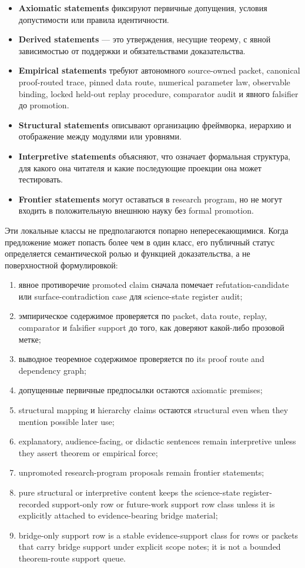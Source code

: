 \begin{itemize}
\item \textbf{Axiomatic statements} фиксируют первичные допущения, условия
      допустимости или правила идентичности.
\item \textbf{Derived statements} — это утверждения, несущие теорему, с явной
      зависимостью от поддержки и обязательствами доказательства.
\item \textbf{Empirical statements} требуют автономного source-owned packet,
      canonical proof-routed trace, pinned data route, numerical parameter
      law, observable binding, locked held-out replay procedure, comparator
      audit и явного falsifier до promotion.
\item \textbf{Structural statements} описывают организацию фреймворка,
      иерархию и отображение между модулями или уровнями.
\item \textbf{Interpretive statements} объясняют, что означает формальная
      структура, для какого она читателя и какие последующие проекции она
      может тестировать.
\item \textbf{Frontier statements} могут оставаться в research program, но не
      могут входить в положительную внешнюю науку без formal promotion.
\end{itemize}
Эти локальные классы не предполагаются попарно непересекающимися. Когда
предложение может попасть более чем в один класс, его публичный статус
определяется семантической ролью и функцией доказательства, а не поверхностной
формулировкой:
\begin{enumerate}
\item явное противоречие promoted claim сначала помечает refutation-candidate
      или surface-contradiction case для science-state register audit;
\item эмпирическое содержимое проверяется по packet, data route, replay,
      comparator и falsifier support до того, как доверяют какой-либо
      прозовой метке;
\item выводное теоремное содержимое проверяется по its proof route and
      dependency graph;
\item допущенные первичные предпосылки остаются axiomatic premises;
\item structural mapping и hierarchy claims остаются structural even when
      they mention possible later use;
\item explanatory, audience-facing, or didactic sentences remain interpretive
      unless they assert theorem or empirical force;
\item unpromoted research-program proposals remain frontier statements;
\item pure structural or interpretive content keeps the science-state register-recorded
      support-only row or future-work support row class unless it is explicitly
      attached to evidence-bearing bridge material;
\item bridge-only support row is a stable evidence-support class for rows or
      packets that carry bridge support under explicit scope notes; it is not a
      bounded theorem-route support queue.
\end{enumerate}
